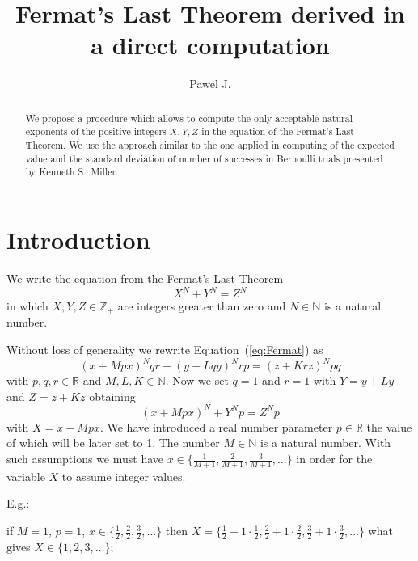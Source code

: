 \documentclass[SecEq,CM,GP]{degruyter-crelle} %
\title[FLT derived in a direct computation]{Fermat's Last Theorem derived in a direct computation}
\author{Pawel J.}{Piskorz}{}{Krakow}
\theoremstyle{plain}
\theoremstyle{definition}
\begin{document}
\begin{abstract}
    We propose a procedure which allows to compute the only acceptable natural
    exponents of the positive integers $X, Y, Z$
    in the equation of the Fermat's Last Theorem. 
    We use the approach similar to the one applied in
    computing of the expected value and the standard deviation of number of successes in Bernoulli 
    trials presented by Kenneth S.~Miller.
\end{abstract}






\section{Introduction}\label{sec:intro}

We write the equation from the Fermat's Last Theorem~\cite{FLT_Wikipedia}
\begin{equation}
\label{eq:Fermat}
X^N + Y^N = Z^N
\end{equation}
in which
$X, Y, Z \in \mathbb{Z_{+}}$ are integers
greater than zero
and $N \in \mathbb{N}$ is a natural number.

Without loss of generality we rewrite Equation~(\ref{eq:Fermat}) as
\begin{equation}
  \label{eq:FermatGeneralEquation}
  (x + Mpx)^{N} qr + (y + Lqy)^{N} rp = (z + Krz)^{N} pq
  \end{equation}
with $p, q, r \in \mathbb{R}$
and $M, L, K \in \mathbb{N}$\@.
Now we set $q=1$ and $r=1$
with $Y = y + Ly$ and $Z = z + Kz$
obtaining
\begin{equation}
\label{eq:FermatEquation}
(x + Mpx)^N + Y^N p = Z^N p
\end{equation}
with $X=x + Mpx$.
We have introduced a real number parameter $p \in \mathbb{R}$ the value of which will 
be later set to 1\@.
The number $M \in \mathbb{N}$ is a natural number.
With such assumptions we must have $x \in \{ \frac{1}{M+1}, \frac{2}{M+1}, \frac{3}{M+1}, \ldots \}$
in order for the variable $X$ to assume integer values.

E.g.:

if $M=1$, $p=1$, $x \in \{ \frac{1}{2}, \frac{2}{2}, \frac{3}{2}, \ldots \}$
 then $X = \{\frac{1}{2} + 1 \cdot \frac{1}{2}, \frac{2}{2} + 1 \cdot \frac{2}{2}, \frac{3}{2} + 1 \cdot \frac{3}{2}, \ldots \}$
what gives 
$X \in \{1, 2, 3, \ldots \}$;
\end{document}
